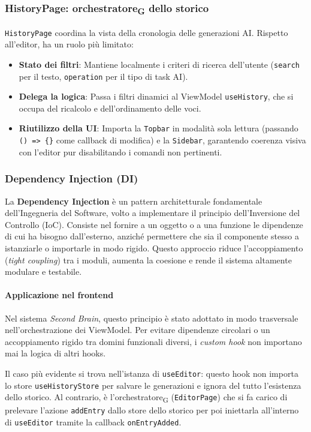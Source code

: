 \documentclass[11pt,a4paper]{article}
\newcommand{\gls}[1]{#1\textsubscript{G}}
\begin{document}
\subsubsection{HistoryPage: \gls{orchestratore} dello storico}
\texttt{HistoryPage} coordina la vista della cronologia delle generazioni AI. Rispetto all'editor, ha un ruolo più limitato:
\begin{itemize}
    \item \textbf{Stato dei filtri}: Mantiene localmente i criteri di ricerca dell'utente (\texttt{search} per il testo, \texttt{operation} per il tipo di task AI).
    \item \textbf{Delega la logica}: Passa i filtri dinamici al ViewModel \texttt{useHistory}, che si occupa del ricalcolo e dell'ordinamento delle voci.
    \item \textbf{Riutilizzo della UI}: Importa la \texttt{Topbar} in modalità sola lettura (passando \texttt{() => \{\}} come callback di modifica) e la \texttt{Sidebar}, garantendo coerenza visiva con l'editor pur disabilitando i comandi non pertinenti.
\end{itemize}

\subsubsection{Dependency Injection (DI)}
La \textbf{Dependency Injection} è un pattern architetturale fondamentale dell'Ingegneria del Software, volto a implementare il principio dell'Inversione del Controllo (IoC). Consiste nel fornire a un oggetto o a una funzione le dipendenze di cui ha bisogno dall'esterno, anziché permettere che sia il componente stesso a istanziarle o importarle in modo rigido. Questo approccio riduce l'accoppiamento (\textit{tight coupling}) tra i moduli, aumenta la coesione e rende il sistema altamente modulare e testabile.

\paragraph{Applicazione nel frontend}
Nel sistema \textit{Second Brain}, questo principio è stato adottato in modo trasversale nell'orchestrazione dei ViewModel. Per evitare dipendenze circolari o un accoppiamento rigido tra domini funzionali diversi, i \textit{custom hook} non importano mai la logica di altri hooks.

Il caso più evidente si trova nell'istanza di \texttt{useEditor}: questo hook non importa lo store \texttt{useHistoryStore} per salvare le generazioni e ignora del tutto l'esistenza dello storico. Al contrario, è l'\gls{orchestratore} (\texttt{EditorPage}) che si fa carico di prelevare l'azione \texttt{addEntry} dallo store dello storico per poi iniettarla all'interno di \texttt{useEditor} tramite la callback \texttt{onEntryAdded}.
\end{document}
